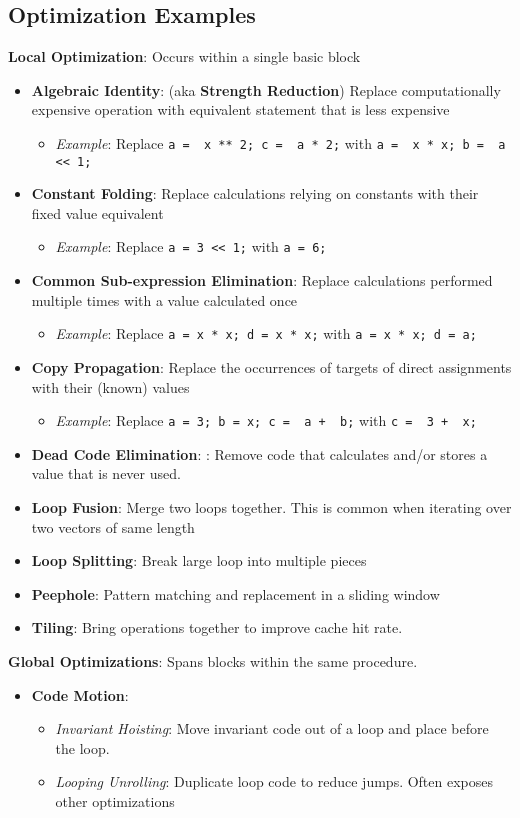 \documentclass[10pt,twocolumn]{report}
\newcommand{\red}[1]{{\color{red} #1}}
\begin{document}
\subsection*{Optimization Examples}

  \newcommand{\longopt}[4]{\item \textbf{#1}: #2\vspace{-6pt}\begin{itemize} \item \textit{Example}: Replace \texttt{{#3}} with \texttt{{#4}} \end{itemize}}
  \newcommand{\shortopt}[2]{\item \textbf{#1}: #2}
  \textbf{Local Optimization}: Occurs within a single basic block
  \begin{itemize}
    \setlength{\itemsep}{0pt}
    \longopt{Algebraic Identity}{(aka \textbf{Strength Reduction}) Replace computationally expensive operation with equivalent statement that is less expensive}{a = \red{x ** 2}; c = \red{a * 2};}{a = \red{x * x}; b = \red{a << 1};}
    \longopt{Constant Folding}{Replace calculations relying on constants with their fixed value equivalent}{a = 3 << 1;}{a = 6;}
    \longopt{Common Sub-expression Elimination}{Replace calculations performed multiple times with a value calculated once}{a = x * x; d = x * x;}{a = x * x; d = a;}
    \longopt{Copy Propagation}{Replace the occurrences of targets of direct assignments with their (known) values}{a = 3; b = x; c = \red{a} + \red{b};}{c = \red{3} + \red{x};}
    \shortopt{Dead Code Elimination}: Remove code that calculates and/or stores a value that is never used.
    \shortopt{Loop Fusion}{Merge two loops together. This is common when iterating over two vectors of same length}
    \shortopt{Loop Splitting}{Break large loop into multiple pieces}
    \shortopt{Peephole}{Pattern matching and replacement in a sliding window}
    \shortopt{Tiling}{Bring operations together to improve cache hit rate.}
\end{itemize}

\textbf{Global Optimizations}: Spans blocks within the same procedure.
\begin{itemize}
  \item  \textbf{Code Motion}:
    \begin{itemize}
      \item \textit{Invariant Hoisting}: Move invariant code out of a loop and place before the loop.
      \item \textit{Looping Unrolling}: Duplicate loop code to reduce jumps.  Often exposes other optimizations
    \end{itemize}
\end{itemize}
\end{document}
